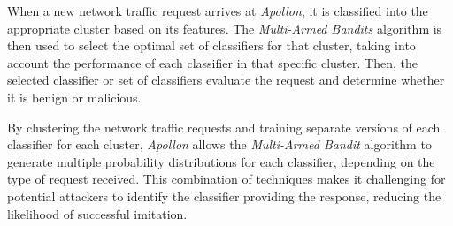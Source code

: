 When a new network traffic request arrives at \textit{Apollon}, it is classified into the appropriate cluster based on
its features.
The \textit{Multi-Armed Bandits} algorithm is then used to select the optimal set of classifiers for that cluster,
taking into account the performance of each classifier in that specific cluster.
Then, the selected classifier or set of classifiers evaluate the request and determine whether it is benign or malicious.

By clustering the network traffic requests and training separate versions of each classifier for each cluster,
\textit{Apollon} allows the \textit{Multi-Armed Bandit} algorithm to generate multiple probability distributions for
each classifier, depending on the type of request received.
This combination of techniques makes it challenging for potential attackers to identify the classifier providing the
response, reducing the likelihood of successful imitation.